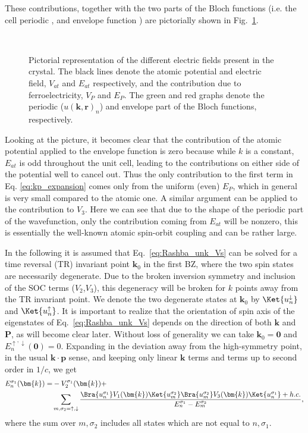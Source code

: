 These contributions, together with the two parts of the Bloch functions (i.e. the cell periodic \unkr, and envelope function \eikr) are pictorially shown in Fig.~\ref{fig:Efield_cell_drawing}. 
\begin{figure}[h]
~\centering
{}\caption{\label{fig:Efield_cell_drawing} Pictorial representation of the different electric fields present in the crystal. The black lines denote the atomic potential and electric field, $V_{at}$ and $E_{at}$ respectively, and the contribution due to ferroelectricity, $V_P$ and $E_P$. The green and red graphs denote the periodic ($u(\bm{k}, \bm{r})_n$) and envelope part of the Bloch functions, respectively.}
\end{figure}

Looking at the picture, it becomes clear that the contribution of the atomic potential applied to the envelope function is zero because while $k$ is a constant, $E_{at}$ is odd throughout the unit cell, leading to the contributions on either side of the potential well to cancel out. Thus the only contribution to the first term in Eq. \ref{eq:kp_expansion} comes only from the uniform (even) $E_P$, which in general is very small compared to the atomic one. A similar argument can be applied to the contribution to $V_3$. Here we can see that due to the shape of the periodic part of the wavefunction, only the contribution coming from $E_{at}$ will be nonzero, this is essentially the well-known atomic spin-orbit coupling and can be rather large. 

In the following it is assumed that Eq.~\ref{eq:Rashba_unk_Vs} can be solved for a time reversal (TR) invariant point $\bm{k}_0$ in the first BZ, where the two spin states are necessarily degenerate. Due to the broken inversion symmetry and inclusion of the SOC terms ($V_2$,$V_3$), this degeneracy will be broken for $k$ points away from the TR invariant point.
We denote the two degenerate states at $\bm{k}_0$ by $\Ket{u_n^\downarrow}$ and $\Ket{u_n^\uparrow}$. It is important to realize that the orientation of spin axis of the eigenstates of Eq.~\ref{eq:Rashba_unk_Vs} depends on the direction of both $\bm{k}$ and $\bm{P}$, as will become clear later.
Without loss of generality we can take $\bm{k}_0 = \bm{0}$ and $E^{\uparrow,\downarrow}_n(\bm{0}) = 0$.
Expanding in the deviation away from the high-symmetry point, in the usual $\bm{k}\cdot\bm{p}$ sense, and keeping only linear $\bm{k}$ terms and terms up to second order in $1/c$, we get
\begin{align}
	\label{eq:kp_expansion}
	E_n^{\sigma_1}(\bm{k}) =& - V_2^{\sigma_1}(\bm{k}) + \\
		& \sum_{m,\sigma_2=\uparrow,\downarrow}\frac{\Bra{u_n^{\sigma_1}} V_1(\bm{k}) \Ket{u_m^{\sigma_2}}\Bra{u_m^{\sigma_2}} V_3(\bm{k}) \Ket{u_n^{\sigma_1}} + h.c.}{E_n^{\sigma_1} - E_m^{\sigma_2}},
\end{align}
where the sum over $m, \sigma_2$ includes all states which are not equal to $n, \sigma_1$. 

